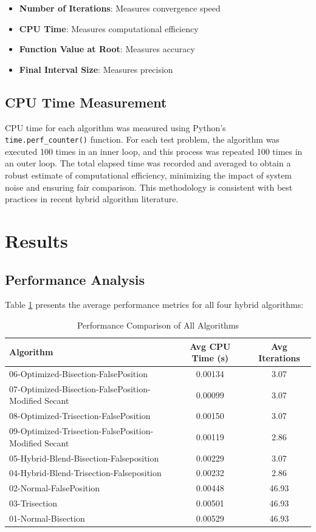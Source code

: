 \documentclass[reprint, amsmath, amssymb, aps, prl]{revtex4-2}
\begin{document}
\begin{itemize}
    \item \textbf{Number of Iterations}: Measures convergence speed
    \item \textbf{CPU Time}: Measures computational efficiency
    \item \textbf{Function Value at Root}: Measures accuracy
    \item \textbf{Final Interval Size}: Measures precision
\end{itemize}

\subsection{CPU Time Measurement}

CPU time for each algorithm was measured using Python's \texttt{time.perf\_counter()} function. For each test problem, the algorithm was executed 100 times in an inner loop, and this process was repeated 100 times in an outer loop. The total elapsed time was recorded and averaged to obtain a robust estimate of computational efficiency, minimizing the impact of system noise and ensuring fair comparison. This methodology is consistent with best practices in recent hybrid algorithm literature.

\section{Results}

\subsection{Performance Analysis}

Table \ref{tab:performance_comparison} presents the average performance metrics for all four hybrid algorithms:

\begin{table}[H]
\centering
\caption{Performance Comparison of All Algorithms}
\label{tab:performance_comparison}
\begin{tabular}{lcc}
\toprule
Algorithm & Avg CPU Time (s) & Avg Iterations \\
\midrule
06-Optimized-Bisection-FalsePosition & 0.00134 & 3.07 \\
07-Optimized-Bisection-FalsePosition-Modified Secant & 0.00099 & 3.07 \\
08-Optimized-Trisection-FalsePosition & 0.00150 & 3.07 \\
09-Optimized-Trisection-FalsePosition-Modified Secant & 0.00119 & 2.86 \\
05-Hybrid-Blend-Bisection-Falseposition & 0.00229 & 3.07 \\
04-Hybrid-Blend-Trisection-Falseposition & 0.00232 & 2.86 \\
02-Normal-FalsePosition & 0.00448 & 46.93 \\
03-Trisection & 0.00501 & 46.93 \\
01-Normal-Bisection & 0.00529 & 46.93 \\
\bottomrule
\end{tabular}
\end{table}
\end{document}

